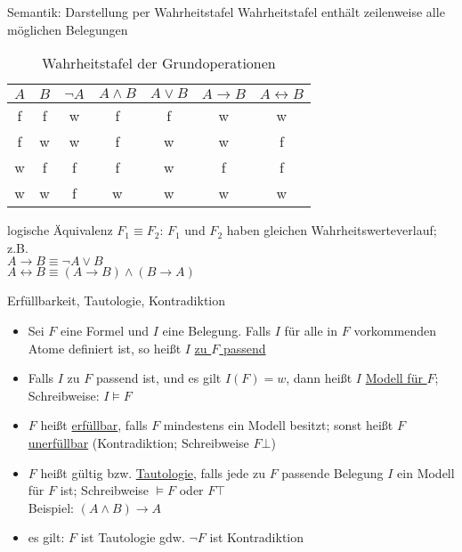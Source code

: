 \begin{frame}{Semantik: Darstellung per Wahrheitstafel}
	Wahrheitstafel enthält zeilenweise alle möglichen Belegungen
	\begin{table}
		\centering
			\begin{tabular}{|c|c|c|c|c|c|c|}
				\hline
				$A$ & $B$ & $\neg A$ & $A \land B$ & $A \lor B$ & $A \rightarrow B$ & $A \leftrightarrow B$ \\
				\hline
				f & f & w & f & f & w & w \\
				\hline
				f & w & w & f & w & w & f \\
				\hline
				w & f & f & f & w & f & f \\
				\hline
				w & w & f & w & w & w & w \\
				\hline
			\end{tabular}
			\caption{Wahrheitstafel der Grundoperationen}
		\end{table}
		logische Äquivalenz $F_1 \equiv F_2$: $F_1$ und $F_2$ haben gleichen Wahrheitswerteverlauf; z.B.\\
		$A \rightarrow B \equiv \neg A \lor B$\\
		$A \leftrightarrow B \equiv (A \rightarrow B) \land (B \rightarrow A)$
\end{frame}

\begin{frame}{Erfüllbarkeit, Tautologie, Kontradiktion}
	\begin{itemize}
		\item Sei $F$ eine Formel und $I$ eine Belegung. Falls $I$ für alle in $F$ vorkommenden Atome definiert ist, so heißt $I$ \underline{zu $F$ passend}
		\item Falls $I$ zu $F$ passend ist, und es gilt $I(F)=w$, dann heißt $I$ \underline{Modell für $F$}; Schreibweise: $I \models F$
		\item $F$ heißt \underline{erfüllbar}, falls $F$ mindestens ein Modell besitzt; sonst heißt $F$ \underline{unerfüllbar} (Kontradiktion; Schreibweise $F\bot$)
		\item $F$ heißt gültig bzw. \underline{Tautologie}, falls jede zu $F$ passende Belegung $I$ ein Modell für $F$ ist; Schreibweise $\models F$ oder $F\top$ \\
		Beispiel: $(A \land B) \rightarrow A$
		\item es gilt: $F$ ist Tautologie gdw. $\neg F$ ist Kontradiktion
	\end{itemize}
\end{frame}

